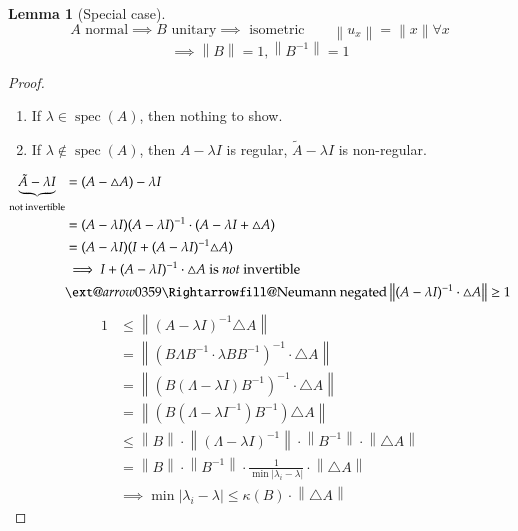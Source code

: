 \documentclass{article}
\makeatletter
\newcounter{lecref}[section]
\numberwithin{lecref}{section}
\newtheorem{lemma}[lecref]{Lemma}
\newcommand{\norm}[1]{\left\|#1\right\|}
\newcommand{\card}[1]{\left|#1\right|}
\newcommand{\xRightarrow}[2][]{\ext@arrow 0359\Rightarrowfill@{#1}{#2}}
\makeatother
\begin{document}
\begin{lemma}[Special case]
  \[ A \text{ normal} \implies B \text{ unitary} \implies \text{ isometric} \qquad \norm{u_x} = \norm{x} \forall x \]
  \[ \implies \norm{B} = 1, \norm{B^{-1}} = 1 \]
\end{lemma}
\begin{proof}
  \begin{enumerate}
    \item If $\lambda \in \operatorname{spec}(A)$, then nothing to show.
    \item If $\lambda \not\in \operatorname{spec}(A)$, then $A - \lambda I$ is regular, $\tilde A - \lambda I$ is non-regular.
  \end{enumerate}
  \begin{align*}
    \underbrace{\tilde A - \lambda I}_{\text{not invertible}}
      &= (A - \triangle A) - \lambda I \\
      &= (A - \lambda I)(A - \lambda I)^{-1} \cdot (A - \lambda I + \triangle A) \\
      &= (A - \lambda I)(I + (A - \lambda I)^{-1} \triangle A) \\
      &\implies I + (A - \lambda I)^{-1} \cdot \triangle A \text{ is \emph{not} invertible} \\
      &\xRightarrow{\text{Neumann negated}} \norm{(A - \lambda I)^{-1} \cdot \triangle A} \geq 1
  \end{align*}
  \begin{align*}
    1 &\leq \norm{(A - \lambda I)^{-1} \triangle A} \\
      &= \norm{(B \Lambda B^{-1} \cdot \lambda BB^{-1})^{-1} \cdot \triangle A} \\
      &= \norm{\left(B \left(\Lambda - \lambda I\right) B^{-1}\right)^{-1} \cdot \triangle A} \\
      &= \norm{(B (\Lambda - \lambda I^{-1}) B^{-1}) \triangle A} \\
      &\leq \norm{B} \cdot \norm{(\Lambda - \lambda I)^{-1}} \cdot \norm{B^{-1}} \cdot \norm{\triangle A} \\
      &= \norm{B} \cdot \norm{B^{-1}} \cdot \frac{1}{\min\card{\lambda_i - \lambda}} \cdot \norm{\triangle A} \\
      &\implies \min\card{\lambda_i - \lambda} \leq \kappa(B) \cdot \norm{\triangle A}
  \end{align*}


\end{proof}
\end{document}

